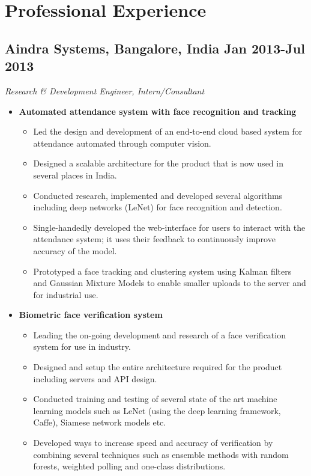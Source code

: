 \documentclass[10pt,letterpaper,sans]{moderncv}        %
\begin{document}
\section{Professional Experience}

\vspace{2pt}

\subsection{\textbf{Aindra Systems}, Bangalore, India \small{Jan 2013-Jul 2013}}
\textit{Research \& Development Engineer, Intern/Consultant}

\begin{small}

\begin{itemize}

\item \textbf{Automated attendance system with face recognition and tracking}
\begin{itemize}
\item Led the design and development of an end-to-end cloud based system for attendance automated through computer vision.
\item Designed a scalable architecture for the product that is now used in several places in India.
\item Conducted research, implemented and developed several algorithms including deep networks (LeNet) for face recognition and detection.
\item Single-handedly developed the web-interface for users to interact with the attendance system; it uses their feedback to continuously improve accuracy of the model.
\item Prototyped a face tracking and clustering system using Kalman filters and Gaussian Mixture Models to enable smaller uploads to the server and for industrial use.
\end{itemize}

\item \textbf{Biometric face verification system}
\begin{itemize}
\item Leading the on-going development and research of a face verification system for use in industry.
\item Designed and setup the entire architecture required for the product including servers and API design.
\item Conducted training and testing of several state of the art machine learning models such as LeNet (using the deep learning framework, Caffe), Siamese network models etc.
\item Developed ways to increase speed and accuracy of verification by combining several techniques such as ensemble methods with random forests, weighted polling and one-class distributions.
\end{itemize}


\end{itemize}
\end{small}
\end{document}
